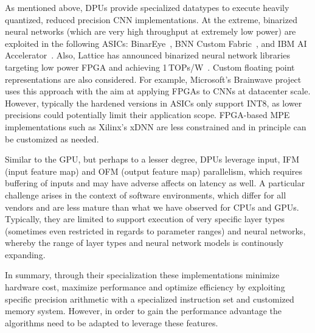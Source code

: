 
As mentioned above, DPUs provide specialized datatypes to execute heavily quantized, reduced precision CNN implementations.
At the extreme, binarized neural networks (which are very high throughput at extremely low power) are exploited in the following ASICs: BinarEye~\cite{binareye}, BNN Custom Fabric~\cite{ando2017brein}, and IBM AI Accelerator~\cite{IBMAI}. Also, Lattice has announced binarized neural network libraries targeting low power FPGA and achieving 1\,TOPs/W~\cite{lattice-bnn}.
Custom floating point representations are also considered. For example, Microsoft's Brainwave project~\cite{chung2018serving} uses this approach with the aim at applying FPGAs to CNNs at datacenter scale.
However, typically the hardened versions in ASICs only support INT8, as lower precisions could potentially limit their application scope. FPGA-based MPE implementations such as Xilinx's xDNN are less constrained and in principle can be customized as needed.

Similar to the GPU, but perhaps to a lesser degree, DPUs leverage input, IFM (input feature map) and OFM (output feature map) parallelism, which requires buffering of inputs and may have adverse affects on latency as well.
A particular challenge arises in the context of software environments, which differ for all vendors and are less mature than what we have observed for CPUs and GPUs. Typically, they are limited to support execution of very specific layer types (sometimes even restricted in regards to parameter ranges) and neural networks, whereby the range of layer types and neural network models is continously expanding.

In summary, through their specialization these implementations minimize hardware cost, maximize performance and optimize efficiency by exploiting specific precision arithmetic with a specialized instruction set and customized memory system. However, in order to gain the performance advantage the algorithms need to be adapted to leverage these features. 

